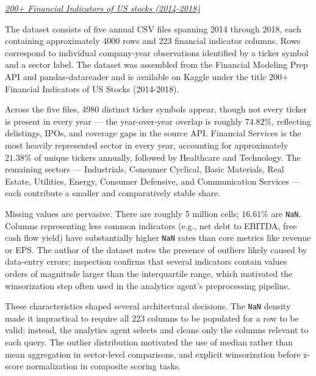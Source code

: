 \begin{center}
  \hyperlink{https://www.kaggle.com/datasets/cnic92/200-financial-indicators-of-us-stocks-20142018}{\textit{200+ Financial Indicators of US stocks (2014-2018)}}
\end{center}

The dataset consists of five annual CSV files spanning 2014 through 2018, each containing approximately 4000 rows and 223 financial indicator columns. Rows correspond to individual company-year observations identified by a ticker symbol and a sector label. The dataset was assembled from the Financial Modeling Prep API and pandas-datareader and is available on Kaggle under the title 200+ Financial Indicators of US Stocks (2014-2018).

Across the five files, 4980 distinct ticker symbols appear, though not every ticker is present in every year — the year-over-year overlap is roughly $74.82\%$, reflecting delistings, IPOs, and coverage gaps in the source API. Financial Services is the most heavily represented sector in every year, accounting for approximately $21.38\%$ of unique tickers annually, followed by Healthcare and Technology. The remaining sectors — Industrials, Consumer Cyclical, Basic Materials, Real Estate, Utilities, Energy, Consumer Defensive, and Communication Services — each contribute a smaller and comparatively stable share.

Missing values are pervasive. There are roughly 5 million cells; $16.61\%$ are \texttt{NaN}. Columns representing less common indicators (e.g., net debt to EBITDA, free cash flow yield) have substantially higher \texttt{NaN} rates than core metrics like revenue or EPS. The author of the dataset notes the presence of outliers likely caused by data-entry errors; inspection confirms that several indicators contain values orders of magnitude larger than the interquartile range, which motivated the winsorization step often used in the analytics agent's preprocessing pipeline.

These characteristics shaped several architectural decisions. The \texttt{NaN} density made it impractical to require all 223 columns to be populated for a row to be valid; instead, the analytics agent selects and cleans only the columns relevant to each query. The outlier distribution motivated the use of median rather than mean aggregation in sector-level comparisons, and explicit winsorization before z-score normalization in composite scoring tasks.
